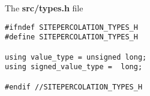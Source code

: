 
The \textbf{src/types.h} file

\begin{lstlisting}[style=CStyle]
#ifndef SITEPERCOLATION_TYPES_H
#define SITEPERCOLATION_TYPES_H

using value_type = unsigned long;
using signed_value_type =  long;

#endif //SITEPERCOLATION_TYPES_H
\end{lstlisting}